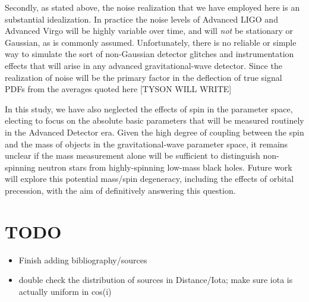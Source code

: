 \documentclass[11pt,a4paper]{emulateapj}
\newcommand{\carl}[1]{{\color{red}  #1}}
\begin{document}
Secondly, as stated above, the noise realization that we have employed here is an substantial idealization.  In practice the noise levels of Advanced LIGO and Advanced Virgo will be highly variable over time, and will \emph{not} be stationary or Gaussian, as is commonly assumed.  Unfortunately, there is no reliable or simple way to simulate the sort of non-Gaussian detector glitches and instrumentation effects that will arise in any advanced gravitational-wave detector.  Since the realization of noise will be the primary factor in the deflection of true signal PDFs from the averages quoted here \carl{[TYSON WILL WRITE]}

In this study, we have also neglected the effects of spin in the parameter space, electing to focus on the absolute basic
 parameters that will be measured routinely in the Advanced Detector era.  Given the high degree of coupling
between the spin and the mass of objects in the gravitational-wave parameter space, it remains unclear
if the mass measurement alone will be sufficient to distinguish non-spinning neutron stars from highly-spinning low-mass
black holes.  Future work will explore this potential mass/spin degeneracy, including the effects of orbital precession, with the aim of definitively answering this question.  

\carl{
\section{TODO}
 \begin{itemize}
 \item Finish adding bibliography/sources
 \item double check the distribution of sources in Distance/Iota; make sure iota is actually uniform in cos(i)
 \end{itemize}
 }


{}
\end{document}
